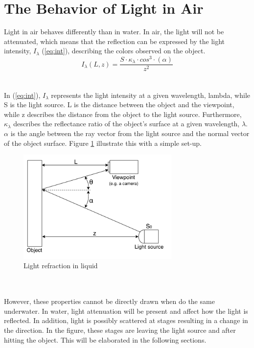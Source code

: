 \section{The Behavior of Light in Air}
Light in air behaves differently than in water. In air, the light will not be attenuated, which means that the reflection can be expressed by the light intensity, $I_ {\lambda}$ (\ref{eq:int}), describing the colors observed on the object.
\begin{equation} \label{eq:int}
    I_ {\lambda} (L, z) = \frac{S \cdot \kappa_{\lambda}\cdot cos^{3}\cdot (\alpha)}{z^2}
\end{equation}
\\\\
In (\ref{eq:int}), $I_{\lambda}$ represents the light intensity at a given wavelength, lambda, while S is the light source. L is the distance between the object and the viewpoint, while z describes the distance from the object to the light source. Furthermore, $\kappa_{\lambda}$ describes the reflectance ratio of the object's surface at a given wavelength, $\lambda$. $\alpha$ is the angle between the ray vector from the light source and the normal vector of the object surface. Figure \ref{fig:reflectance} illustrate this with a simple set-up.
\begin{figure}[H]
\centering
  \includegraphics[width=8cm]{Images/theory/reflectance.png}
  \caption{Light refraction in liquid}
  \label{fig:reflectance}
\end{figure}
\\\\
\noindent
However, these properties cannot be directly drawn when do the same underwater. In water, light attenuation will be present and affect how the light is reflected. In addition, light is possibly scattered at stages resulting in a change in the direction. In the figure, these stages are leaving the light source and after hitting the object. This will be elaborated in the following sections.

